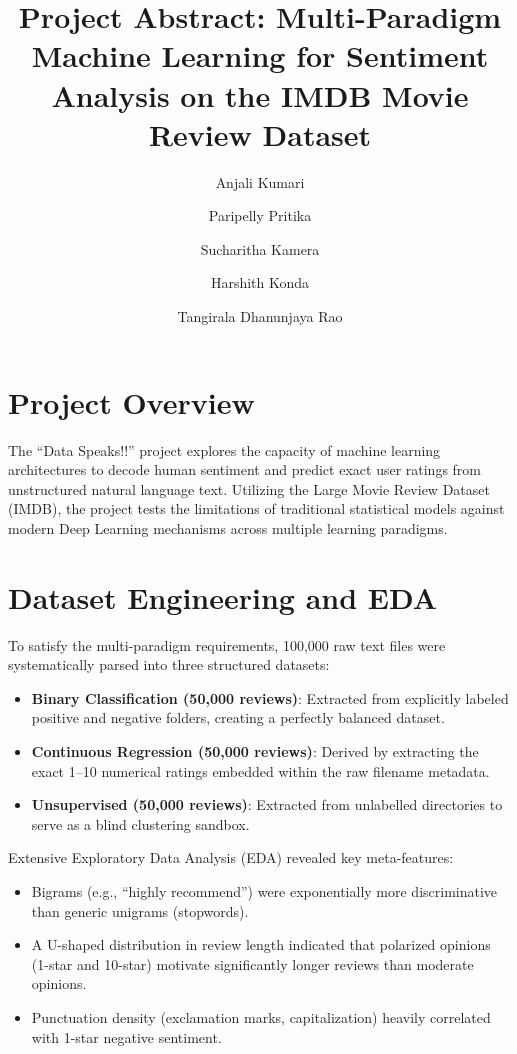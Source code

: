 \documentclass[12pt]{article}
\title{\textbf{Project Abstract: Multi-Paradigm Machine Learning for Sentiment Analysis on the IMDB Movie Review Dataset}}
\author{Anjali Kumari}
\author{Paripelly Pritika}
\author{Sucharitha Kamera}
\author{Harshith Konda}
\author{Tangirala Dhanunjaya Rao}
\affil{Data Speaks!! Course Assignment}
\date{}
\begin{document}
\maketitle

\section*{Project Overview}
The ``Data Speaks!!'' project explores the capacity of machine learning architectures to decode human sentiment and predict exact user ratings from unstructured natural language text. Utilizing the Large Movie Review Dataset (IMDB), the project tests the limitations of traditional statistical models against modern Deep Learning mechanisms across multiple learning paradigms. 

\section*{Dataset Engineering and EDA}
To satisfy the multi-paradigm requirements, 100,000 raw text files were systematically parsed into three structured datasets:
\begin{itemize}
    \item \textbf{Binary Classification (50,000 reviews)}: Extracted from explicitly labeled positive and negative folders, creating a perfectly balanced dataset.
    \item \textbf{Continuous Regression (50,000 reviews)}: Derived by extracting the exact 1--10 numerical ratings embedded within the raw filename metadata.
    \item \textbf{Unsupervised (50,000 reviews)}: Extracted from unlabelled directories to serve as a blind clustering sandbox.
\end{itemize}

Extensive Exploratory Data Analysis (EDA) revealed key meta-features:
\begin{itemize}
    \item Bigrams (e.g., ``highly recommend'') were exponentially more discriminative than generic unigrams (stopwords).
    \item A U-shaped distribution in review length indicated that polarized opinions (1-star and 10-star) motivate significantly longer reviews than moderate opinions.
    \item Punctuation density (exclamation marks, capitalization) heavily correlated with 1-star negative sentiment.
\end{itemize}
\end{document}
